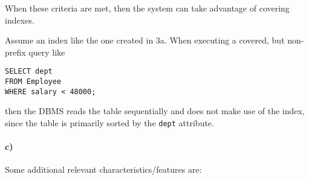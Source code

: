 \documentclass[11pt]{scrartcl}
\begin{document}
When these criteria are met, then the system can take advantage of covering indexes.

Assume an index like the one created in 3a.
When executing a covered, but non-prefix query like

\begin{lstlisting}[style=dbtsql]
SELECT dept
FROM Employee
WHERE salary < 48000;
\end{lstlisting}

then the DBMS reads the table sequentially and does not make use of the index, since the table is primarily sorted by the
\texttt{dept} attribute.

\paragraph{c)}

Some additional relevant characteristics/features are:
\end{document}
